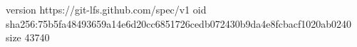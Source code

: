 version https://git-lfs.github.com/spec/v1
oid sha256:75b5fa48493659a14e6d20cc6851726cedb072430b9da4e8fcbacf1020ab0240
size 43740
